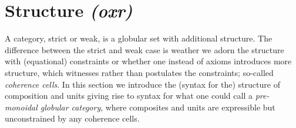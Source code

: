 \section{Structure \textit{(oxr)}}
\label{sec:structure}



A category, strict or weak, is a globular set with additional
structure. The difference between the strict and weak case is weather
we adorn the structure with (equational) constraints or whether one instead
of axioms introduces more structure, which witnesses rather than postulates
the constraints; so-called \emph{coherence cells}. In this section we
introduce the (syntax for the) structure of composition and units
giving rise to syntax for what one could call a \emph{pre-monoidal
  globular category}, where composites and units are expressible but
unconstrained by any coherence cells.

